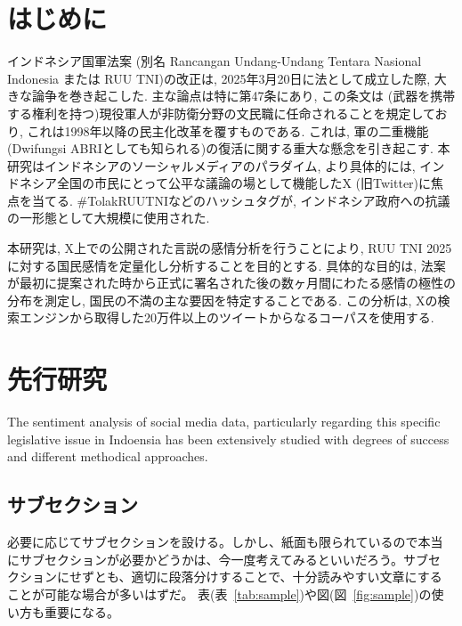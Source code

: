 \documentclass{jabstract}
\begin{document}
\maketitle

\begin{multicols}{2}
  
\section{はじめに}
インドネシア国軍法案 (別名 Rancangan Undang-Undang Tentara Nasional Indonesia または RUU TNI)の改正は, 2025年3月20日に法として成立した際, 大きな論争を巻き起こした. 主な論点は特に第47条にあり, この条文は (武器を携帯する権利を持つ)現役軍人が非防衛分野の文民職に任命されることを規定しており, これは1998年以降の民主化改革を覆すものである. これは, 軍の二重機能 (Dwifungsi ABRIとしても知られる)\cite{HRW2024}の復活に関する重大な懸念を引き起こす. 本研究はインドネシアのソーシャルメディアのパラダイム, より具体的には, インドネシア全国の市民にとって公平な議論の場として機能したX (旧Twitter)に焦点を当てる. \#TolakRUUTNIなどのハッシュタグが, インドネシア政府への抗議の一形態として大規模に使用された\cite{CNN2024}.

本研究は, X上での公開された言説の感情分析を行うことにより, RUU TNI 2025に対する国民感情を定量化し分析することを目的とする. 具体的な目的は, 法案が最初に提案された時から正式に署名された後の数ヶ月間にわたる感情の極性の分布を測定し, 国民の不満の主な要因を特定することである. この分析は, Xの検索エンジンから取得した20万件以上のツイートからなるコーパスを使用する.
\section{先行研究}
The sentiment analysis of social media data, particularly regarding this specific legislative issue in Indoensia has been extensively studied with degrees of success and different methodical approaches. 

\subsection{サブセクション}
必要に応じてサブセクションを設ける。しかし、紙面も限られているので本当
にサブセクションが必要かどうかは、今一度考えてみるといいだろう。サブセ
クションにせずとも、適切に段落分けすることで、十分読みやすい文章にする
ことが可能な場合が多いはずだ。
表(表~\ref{tab:sample})や図(図~\ref{fig:sample})の使い方も重要になる。


\end{multicols}
\end{document}
